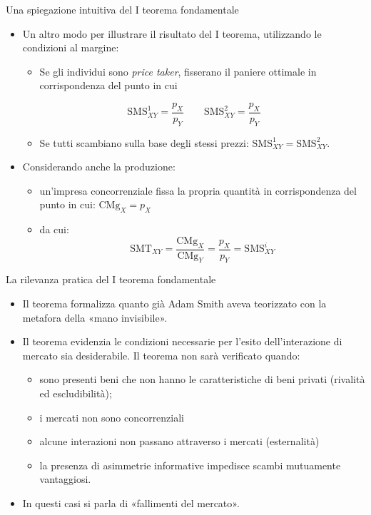 \documentclass[aspectratio=64,12pt]{beamer}
\begin{document}
\begin{frame}{Una spiegazione intuitiva del I teorema fondamentale}
\begin{itemize}
\item Un altro modo per illustrare il risultato del I teorema, utilizzando le condizioni al margine:
\begin{itemize}
\item Se gli individui sono \emph{price taker}, fisserano il paniere ottimale in corrispondenza del punto in cui
\end{itemize}
\begin{equation*}
\text{SMS}^1_{XY}=\frac{p_X}{p_Y} \qquad \text{SMS}^2_{XY}=\frac{p_X}{p_Y}
\end{equation*}
\begin{itemize}
\item Se tutti scambiano sulla base degli stessi prezzi: $\text{SMS}^1_{XY} = \text{SMS}^2_{XY}$.
\end{itemize}
\item Considerando anche la produzione:
\begin{itemize}
\item un’impresa concorrenziale fissa la propria quantità in corrispondenza del punto in cui:   $\text{CMg}_X=p_X$
\item da cui: $$\text{SMT}_{XY}=\frac{\text{CMg}_X}{\text{CMg}_Y}=\frac{p_X}{p_Y} = \text{SMS}^i_{XY}$$
\end{itemize}
\end{itemize}
\end{frame}

\begin{frame}{La rilevanza pratica del I teorema fondamentale}
\begin{itemize}
\item Il teorema formalizza quanto già Adam Smith aveva teorizzato con la metafora
della «mano invisibile».
\item Il teorema evidenzia le condizioni necessarie per l'esito
  dell'interazione di mercato sia desiderabile. Il teorema non sarà verificato
  quando:
\begin{itemize}
\item sono presenti beni che non hanno le caratteristiche di beni privati
(rivalità ed escludibilità);
\item i mercati non sono \alert{concorrenziali}
\item alcune interazioni non passano attraverso i mercati (\alert{esternalità})
\item la presenza di \alert{asimmetrie informative} impedisce scambi
  mutuamente vantaggiosi.
\end{itemize}
\item In questi casi si parla di «fallimenti del mercato».
\end{itemize}
\end{frame}
\end{document}
